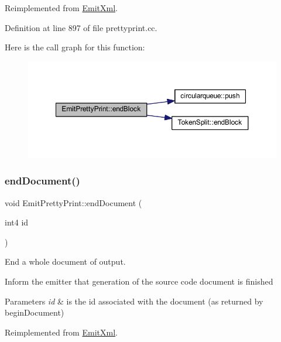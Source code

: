 Reimplemented from \mbox{\hyperlink{class_emit_xml_a935b2c6ff63356ee30fa050c2b301bde}{Emit\+Xml}}.



Definition at line 897 of file prettyprint.\+cc.

Here is the call graph for this function\+:
\nopagebreak
\begin{figure}[H]
\begin{center}
\leavevmode
\includegraphics[width=350pt]{class_emit_pretty_print_a1d95f0f7503689370b28f9538690b5a4_cgraph}
\end{center}
\end{figure}
\mbox{\label{class_emit_pretty_print_aca37d689adabda9dd84cc333c87cabd8}} 
\subsubsection{\texorpdfstring{endDocument()}{endDocument()}}
{\footnotesize\ttfamily void Emit\+Pretty\+Print\+::end\+Document (\begin{DoxyParamCaption}\item[{int4}]{id }\end{DoxyParamCaption})\hspace{0.3cm}{\ttfamily [virtual]}}



End a whole document of output. 

Inform the emitter that generation of the source code document is finished 
\begin{DoxyParams}{Parameters}
{\em id} & is the id associated with the document (as returned by begin\+Document) \\
\hline
\end{DoxyParams}


Reimplemented from \mbox{\hyperlink{class_emit_xml_a8f2e7a4f2cd9fee90bed1eb966414424}{Emit\+Xml}}.



